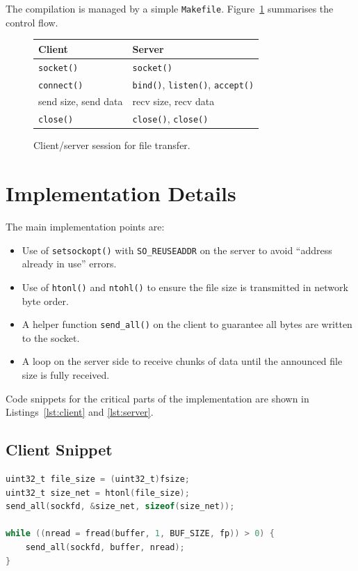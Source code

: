 \documentclass[a4paper,11pt]{article}
\begin{document}
The compilation is managed by a simple \texttt{Makefile}.  Figure~\ref{fig:flow}
summarises the control flow.

\begin{figure}[h]
  \centering
  \begin{tabular}{p{}p{}}
    \textbf{Client} & \textbf{Server} \\
    \hline
    \texttt{socket()} & \texttt{socket()} \\
    \texttt{connect()} & \texttt{bind()}, \texttt{listen()}, \texttt{accept()} \\
    send size, send data & recv size, recv data \\
    \texttt{close()} & \texttt{close()}, \texttt{close()}
  \end{tabular}
  \caption{Client/server session for file transfer.}
  \label{fig:flow}
\end{figure}

\section{Implementation Details}

The main implementation points are:

\begin{itemize}
  \item Use of \texttt{setsockopt()} with \texttt{SO\_REUSEADDR} on the server
        to avoid ``address already in use'' errors.
  \item Use of \texttt{htonl()} and \texttt{ntohl()} to ensure the file size is
        transmitted in network byte order.
  \item A helper function \texttt{send\_all()} on the client to guarantee all
        bytes are written to the socket.
  \item A loop on the server side to receive chunks of data until the announced
        file size is fully received.
\end{itemize}

Code snippets for the critical parts of the implementation are shown in
Listings~\ref{lst:client} and \ref{lst:server}.

\subsection*{Client Snippet}
\begin{lstlisting}[language=C,caption={Sending the file size and data},label={lst:client}]
uint32_t file_size = (uint32_t)fsize;
uint32_t size_net = htonl(file_size);
send_all(sockfd, &size_net, sizeof(size_net));

while ((nread = fread(buffer, 1, BUF_SIZE, fp)) > 0) {
    send_all(sockfd, buffer, nread);
}
\end{lstlisting}
\end{document}

